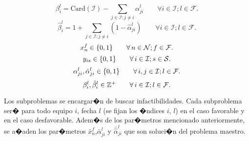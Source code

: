 \documentclass[authoryear,preprint,review,12pt]{elsarticle}
\begin{document}
\begin{equation}\label{ecua13}
   \beta_{i}^l = \text{Card$(\mathcal{I})$} - \sum_{j\in \mathcal{I}: j \neq i} \alpha_{ji}^l \qquad \forall i \in \mathcal{I}; l \in \mathcal{F}.
\end{equation}
\begin{equation}\label{ecua14}
   \hat{\beta}_{i}^l = 1 + \sum_{j\in \mathcal{I}: j \neq i} (1-\hat{\alpha}_{ji}^l) \qquad \forall i \in \mathcal{I}; l \in \mathcal{F}.
\end{equation}
\begin{equation}\label{ecua29}
  x_n^f \in\{0,1\} \qquad \forall\, n \in \mathcal{N}; f \in \mathcal{F}.\\
\end{equation}
\begin{equation}\label{ecua30}
  y_{is} \in\{0,1\} \qquad \forall\, i \in \mathcal{I}; s \in \mathcal{S}.\\
\end{equation}
\begin{equation}\label{ecua33}
  \alpha_{ji}^l, \hat{\alpha}_{ji}^l \in \{0,1\} \qquad \forall\, i,j \in \mathcal{I}; l \in \mathcal{F}.\\
\end{equation}
\begin{equation}\label{ecua34}
  \beta_{i}^l, \hat{\beta}_{i}^l \in \mathbb{Z}^+ \qquad \forall\, i \in \mathcal{I}; l \in \mathcal{F}.\\
\end{equation}

Los subproblemas se encargar�n de buscar infactibilidades.  Cada subproblema ser� para todo equipo $i$,  fecha $l$ (se fijan los �ndices $i$, $l$) en el caso favorable y en el caso desfavorable.  Adem�s de los par�metros mencionado anteriormente,  se a�aden los par�metros $\bar{x}_n^f$,$\bar{\alpha}_{ji}^l$ y $\bar{\hat{\alpha}}_{ji}^l$ que son soluci�n del problema maestro.
\end{document}
